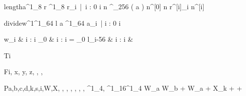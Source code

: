 \documentclass[12pt,a4paper]{book}
\begin{document}


\begin{eqcode}{length}{a}{}{^1_8}
    r \in {}^1_8 \lend
    r_i\  |\  i : 0 \leq i   \lend
    n ^{\lfloor \log_{256} \left ( a \right ) \rfloor } \lend
    n^{[0]} \gets n \lend
    r^{[i]}_i \gets {} \lend
    n^{[i]} \gets {} \lend
     \lend
\end{eqcode}

\begin{eqcode}{divide}{w}{^1}{^1_{64}}
    l \gets {} \lend
    a \in {}^1_64 \lend
    a_i\   |  i : 0 \leq i \ \gets
        \begin{cases}
            w_i & i : i \leq {}_0 \lend
              & i : i = _0 \lend
            l_{i-56} & i : i   & \otherwise \lend
        \end{cases} \lend
     \lend
\end{eqcode}

\begin{eqcode}{T}{i}{}{}
     \lend
\end{eqcode}

\begin{eqcode}{F}{i, x, y, z}{, , ,
}{}
        \lend
       \lend
       \lend
       \lend
    \qendif
\end{eqcode}

\begin{eqcode}{P}{a,b,c,d,k,s,i,W,X}{, , ,
, , , , ^1_4,
^1_{16}}{^1_4}
    W_a \gets W_b + {W_a + X_k +   +
    } \lend
     \lend
\end{eqcode}
\end{document}
